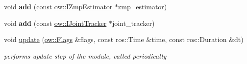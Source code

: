 \begin{DoxyCompactItemize}
\item 
void {\bfseries add} (const \hyperlink{classow_1_1IZmpEstimator}{ow\+::\+I\+Zmp\+Estimator} $\ast$zmp\+\_\+estimator)\hypertarget{classow__pub_1_1StatePublisher_a79443faa057d02394a33375beac9d476}{}\label{classow__pub_1_1StatePublisher_a79443faa057d02394a33375beac9d476}

\item 
void {\bfseries add} (const \hyperlink{classow_1_1IJointTracker}{ow\+::\+I\+Joint\+Tracker} $\ast$joint\+\_\+tracker)\hypertarget{classow__pub_1_1StatePublisher_af423fe8061262566f7004c0172fb1ef4}{}\label{classow__pub_1_1StatePublisher_af423fe8061262566f7004c0172fb1ef4}

\item 
void \hyperlink{classow__pub_1_1StatePublisher_a61b1d103496f2e64cf52ea877fd6da5a}{update} (\hyperlink{classow__core_1_1Flags}{ow\+::\+Flags} \&flags, const ros\+::\+Time \&time, const ros\+::\+Duration \&dt)
\begin{DoxyCompactList}\small\item\em performs update step of the module, called periodically \end{DoxyCompactList}\end{DoxyCompactItemize}
